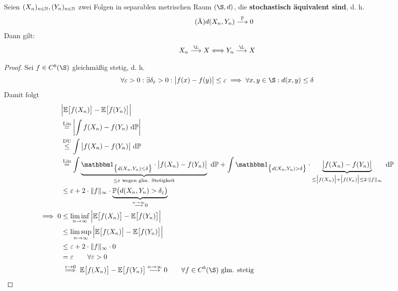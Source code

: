 \begin{satz}[Cramér]\enter\label{satz4.14Cramer}
Seien $(X_n)_{n\in\N},(Y_n)_{n\in\N}$ zwei Folgen in separablen metrischen Raum $(\S,d)$, die \textbf{stochastisch äquivalent sind}, d. h.
\begin{align}\label{eq4.14StochastischAquivalent}\tag{Ä}
d(X_n,Y_n)\stackrel{\P}{\longrightarrow}0
\end{align}
Dann gilt:
\begin{align*}
X_n\stackrel{\L}{\longrightarrow} X\Longleftrightarrow Y_n\stackrel{\L}{\longrightarrow} X
\end{align*}
\end{satz}
\begin{proof}
Sei $f\in C^b(\S)$ gleichmäßig stetig, d. h.
\begin{align*}
\forall\varepsilon>0:\exists\delta_\varepsilon>0:\big|f(x)-f(y)\big|\leq\varepsilon\implies\forall x,y\in\S:d(x,y)\leq\delta
\end{align*}
Damit folgt
\begin{align*}
&\Big|\E\big[f(X_n)\big]-\E\big[f(Y_n)\big]\Big|\\
&\stackeq{\text{Lin}}
\left|\int\limits f(X_n)-f(Y_n)\d\P\right|\\
&\stackrel{\text{DU}}{\leq}
\int\limits\big|f(X_n)-f(Y_n)\big|\d\P\\
&\stackeq{\text{Lin}}
\int\limits\underbrace{\indi_{\big\lbrace d(X_n,Y_n)\leq\delta\big\rbrace}\cdot\big|f(X_n)-f(Y_n)\big|}_{\leq\varepsilon\text{ wegen glm. Stetigkeit}}\d\P+
\int\limits\indi_{\big\lbrace d(X_n,Y_n)>\delta\big\rbrace}\cdot\underbrace{\big|f(X_n)-f(Y_n)\big|}_{\leq\big|f(X_n)\big|+\big|f(Y_n)\big|\leq2\cdot\Vert f\Vert_\infty}\d\P\\
&\leq\varepsilon+2\cdot\Vert f\Vert_\infty\cdot\underbrace{\P\big(d(X_n,Y_n)>\delta_\varepsilon\big)}_{\stackrel{n\to\infty}{\longrightarrow}0}\\
\implies
0&\leq\liminf\limits_{n\to\infty}\Big|\E\big[f(X_n)\big]-\E\big[f(Y_n)\big]\Big|\\
&\leq\limsup\limits_{n\to\infty}\Big|\E\big[f(X_n)\big]-\E\big[f(Y_n)\big]\Big|\\
&\leq\varepsilon+2\cdot\Vert f\Vert_\infty\cdot 0\\
&=\varepsilon\qquad\forall\varepsilon>0\\
&\stackrel{\varepsilon\to0}{\implies}
\E\big[f(X_n)\big]-\E\big[f(Y_n)\big]\stackrel{n\to\infty}{\longrightarrow} 0\qquad\forall f\in C^b(\S)\text{ glm. stetig}
\end{align*}

\end{proof}
